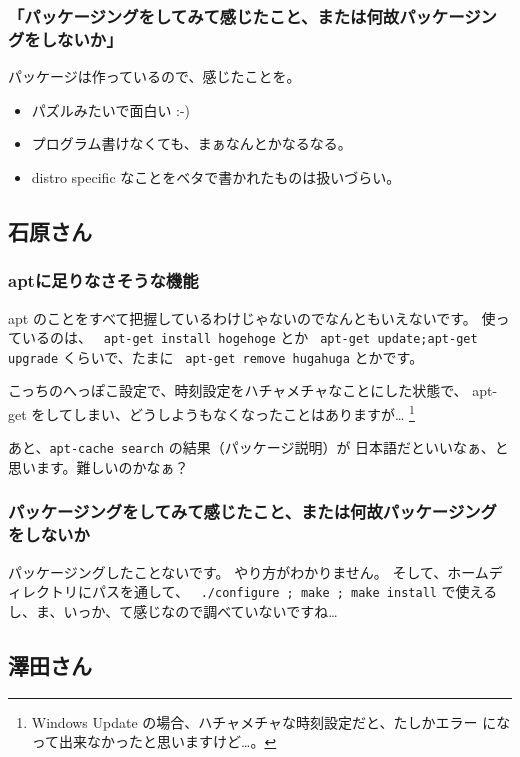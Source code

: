 \documentclass[mingoth,a4paper]{jsarticle}
\begin{document}
\subsubsection*{「パッケージングをしてみて感じたこと、または何故パッケージングをしないか」}

パッケージは作っているので、感じたことを。

\begin{itemize}
 \item パズルみたいで面白い :-)
 \item プログラム書けなくても、まぁなんとかなるなる。
 \item distro specific なことをベタで書かれたものは扱いづらい。
\end{itemize}

\subsection{石原さん}

\subsubsection*{aptに足りなさそうな機能}

apt のことをすべて把握しているわけじゃないのでなんともいえないです。
使っているのは、
\texttt{ apt-get install hogehoge}
とか
\texttt{ apt-get update;apt-get upgrade}
くらいで、たまに
\texttt{ apt-get remove hugahuga}
とかです。

こっちのへっぽこ設定で、時刻設定をハチャメチャなことにした状態で、
apt-get をしてしまい、どうしようもなくなったことはありますが…
\footnote{Windows Update の場合、ハチャメチャな時刻設定だと、たしかエラー
になって出来なかったと思いますけど…。}

あと、\texttt{apt-cache search} の結果（パッケージ説明）が
日本語だといいなぁ、と思います。難しいのかなぁ？

\subsubsection*{パッケージングをしてみて感じたこと、または何故パッケージングをしないか}

パッケージングしたことないです。
やり方がわかりません。
そして、ホームディレクトリにパスを通して、
\texttt{ ./configure ; make ; make install}
で使えるし、ま、いっか、て感じなので調べていないですね…

\subsection{澤田さん}
\end{document}
